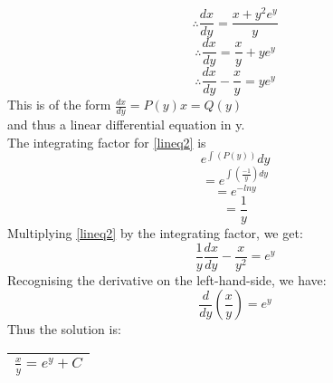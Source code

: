 \documentclass[a4paper,11ppt]{article}
\begin{document}
\[\therefore \frac{dx}{dy} = \frac{x+y^2e^y}{y}\]
\[\therefore \frac{dx}{dy} = \frac{x}{y}+ye^y\]
\begin{equation}
\therefore \frac{dx}{dy} - \frac{x}{y} = ye^y \label{lineq2}
\end{equation}
This is of the form $\frac{dx}{dy} = P(y)x = Q(y)$\\
and thus a linear differential equation in y.\\
The integrating factor for \eqref{lineq2} is\\
\[  e^{\int(P(y))}dy\]
\[= e^{\int(\frac{-1}{y})dy}\]
\[= e^{-lny}\]
\[= \frac{1}{y}\]
Multiplying \eqref{lineq2} by the integrating factor, we get:\\
\[\frac{1}{y}\frac{dx}{dy} - \frac{x}{y^2} = e^y\]
Recognising the derivative on the left-hand-side, we have:\\
\[\frac{d}{dy}\left(\frac{x}{y}\right) = e^y\]
Thus the solution is:
{\renewcommand{\arraystretch}{1.5}
\begin{center}
\begin{tabular}{|c|}
\hline
$\frac{x}{y} = e^y + C$\\
\hline
\end{tabular}
\end{center}}
\end{document}
